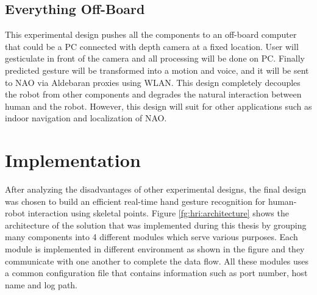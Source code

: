 

\subsection{Everything Off-Board} This experimental design pushes all the components to an off-board computer that could be a PC connected with depth camera at a fixed location. User will gesticulate in front of the camera and all processing will be done on PC. Finally predicted gesture will be transformed into a motion and voice, and it will be sent to NAO via Aldebaran proxies using WLAN. This design completely decouples the robot from other components and degrades the natural interaction between human and the robot. However, this design will suit for other applications such as indoor navigation and localization of NAO.

\section{Implementation} \label{sec:sol:impl} After analyzing the disadvantages of other experimental designs, the final design was chosen to build an efficient real-time hand gesture recognition for human-robot interaction using skeletal points. Figure \ref{fg:hri:architecture} shows the architecture of the solution that was implemented during this thesis by grouping many components into 4 different modules which serve various purposes. Each module is implemented in different environment as shown in the figure and they communicate with one another to complete the data flow. All these modules uses a common configuration file that contains information such as port number, host name and log path.



%
% 
%
%
%



%
%













